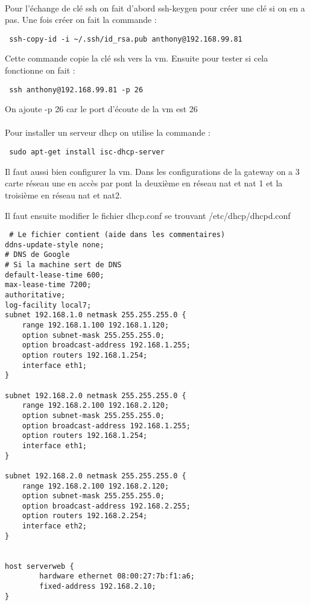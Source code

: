 \documentclass[a4paper,12pt]{article}
\begin{document}
\paragraph{}
Pour l'échange de clé ssh on fait d'abord ssh-keygen pour créer une clé si on en a pas.
Une fois créer on fait la commande :
\begin{verbatim}
 ssh-copy-id -i ~/.ssh/id_rsa.pub anthony@192.168.99.81
\end{verbatim}
Cette commande copie la clé ssh vers la vm.
Ensuite pour tester si cela fonctionne on fait :
\begin{verbatim}
 ssh anthony@192.168.99.81 -p 26
\end{verbatim}
On ajoute -p 26 car le port d'écoute de la vm est 26

\paragraph{}
Pour installer un serveur dhcp on utilise la commande :
\begin{verbatim}
 sudo apt-get install isc-dhcp-server
\end{verbatim}

Il faut aussi bien configurer la vm. Dans les configurations de la gateway on a 3 carte réseau une en accès par pont la deuxième en réseau nat et nat 1 et la troisième en réseau nat et nat2.

Il faut ensuite modifier le fichier dhcp.conf se trouvant /etc/dhcp/dhcpd.conf
\begin{verbatim}
 # Le fichier contient (aide dans les commentaires)
ddns-update-style none;
# DNS de Google
# Si la machine sert de DNS
default-lease-time 600;
max-lease-time 7200;
authoritative;
log-facility local7;
subnet 192.168.1.0 netmask 255.255.255.0 {
    range 192.168.1.100 192.168.1.120;
    option subnet-mask 255.255.255.0;
    option broadcast-address 192.168.1.255;
    option routers 192.168.1.254;
    interface eth1;
}

subnet 192.168.2.0 netmask 255.255.255.0 {
    range 192.168.2.100 192.168.2.120;
    option subnet-mask 255.255.255.0;
    option broadcast-address 192.168.1.255;
    option routers 192.168.1.254;
    interface eth1;
}

subnet 192.168.2.0 netmask 255.255.255.0 {
    range 192.168.2.100 192.168.2.120;
    option subnet-mask 255.255.255.0;
    option broadcast-address 192.168.2.255;
    option routers 192.168.2.254;
    interface eth2;
}


host serverweb {
        hardware ethernet 08:00:27:7b:f1:a6;
        fixed-address 192.168.2.10;
}


\end{verbatim}
\end{document}

